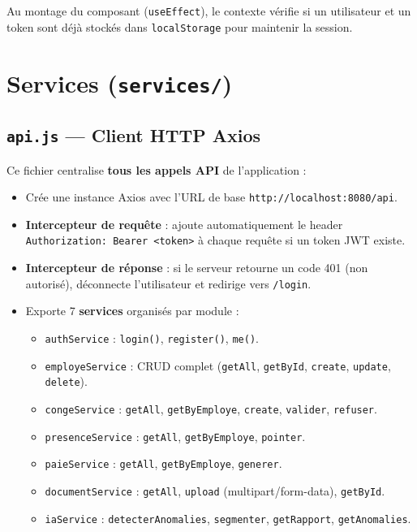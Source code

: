 \documentclass[a4paper,12pt]{report}
\begin{document}
Au montage du composant (\texttt{useEffect}), le contexte vérifie si un utilisateur et un token sont déjà stockés dans \texttt{localStorage} pour maintenir la session.

\section{Services (\texttt{services/})}

\subsection{\texttt{api.js} --- Client HTTP Axios}
Ce fichier centralise \textbf{tous les appels API} de l'application :

\begin{itemize}
  \item Crée une instance Axios avec l'URL de base \texttt{http://localhost:8080/api}.
  \item \textbf{Intercepteur de requête} : ajoute automatiquement le header \texttt{Authorization: Bearer <token>} à chaque requête si un token JWT existe.
  \item \textbf{Intercepteur de réponse} : si le serveur retourne un code 401 (non autorisé), déconnecte l'utilisateur et redirige vers \texttt{/login}.
  \item Exporte 7 \textbf{services} organisés par module :
  \begin{itemize}
    \item \texttt{authService} : \texttt{login()}, \texttt{register()}, \texttt{me()}.
    \item \texttt{employeService} : CRUD complet (\texttt{getAll}, \texttt{getById}, \texttt{create}, \texttt{update}, \texttt{delete}).
    \item \texttt{congeService} : \texttt{getAll}, \texttt{getByEmploye}, \texttt{create}, \texttt{valider}, \texttt{refuser}.
    \item \texttt{presenceService} : \texttt{getAll}, \texttt{getByEmploye}, \texttt{pointer}.
    \item \texttt{paieService} : \texttt{getAll}, \texttt{getByEmploye}, \texttt{generer}.
    \item \texttt{documentService} : \texttt{getAll}, \texttt{upload} (multipart/form-data), \texttt{getById}.
    \item \texttt{iaService} : \texttt{detecterAnomalies}, \texttt{segmenter}, \texttt{getRapport}, \texttt{getAnomalies}.
  \end{itemize}
\end{itemize}
\end{document}
